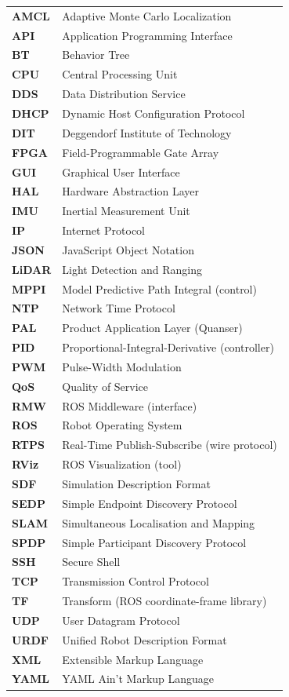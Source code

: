 \begin{longtable}{@{}p{3cm}p{10cm}@{}}
\textbf{AMCL} & Adaptive Monte Carlo Localization \\
\textbf{API} & Application Programming Interface \\
\textbf{BT} & Behavior Tree \\
\textbf{CPU} & Central Processing Unit \\
\textbf{DDS} & Data Distribution Service \\
\textbf{DHCP} & Dynamic Host Configuration Protocol \\
\textbf{DIT} & Deggendorf Institute of Technology \\
\textbf{FPGA} & Field-Programmable Gate Array \\
\textbf{GUI} & Graphical User Interface \\
\textbf{HAL} & Hardware Abstraction Layer \\
\textbf{IMU} & Inertial Measurement Unit \\
\textbf{IP} & Internet Protocol \\
\textbf{JSON} & JavaScript Object Notation \\
\textbf{LiDAR} & Light Detection and Ranging \\
\textbf{MPPI} & Model Predictive Path Integral (control) \\
\textbf{NTP} & Network Time Protocol \\
\textbf{PAL} & Product Application Layer (Quanser) \\
\textbf{PID} & Proportional-Integral-Derivative (controller) \\
\textbf{PWM} & Pulse-Width Modulation \\
\textbf{QoS} & Quality of Service \\
\textbf{RMW} & ROS Middleware (interface) \\
\textbf{ROS} & Robot Operating System \\
\textbf{RTPS} & Real-Time Publish-Subscribe (wire protocol) \\
\textbf{RViz} & ROS Visualization (tool) \\
\textbf{SDF} & Simulation Description Format \\
\textbf{SEDP} & Simple Endpoint Discovery Protocol \\
\textbf{SLAM} & Simultaneous Localisation and Mapping \\
\textbf{SPDP} & Simple Participant Discovery Protocol \\
\textbf{SSH} & Secure Shell \\
\textbf{TCP} & Transmission Control Protocol \\
\textbf{TF} & Transform (ROS coordinate-frame library) \\
\textbf{UDP} & User Datagram Protocol \\
\textbf{URDF} & Unified Robot Description Format \\
\textbf{XML} & Extensible Markup Language \\
\textbf{YAML} & YAML Ain't Markup Language \\
\end{longtable}
